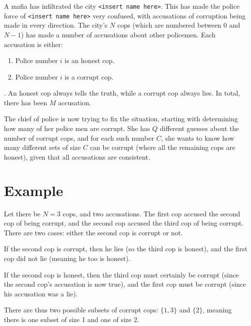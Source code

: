 \newcommand\version{v1}
A mafia has infiltrated the city \texttt{<insert name here>}.
This has made the police force of \texttt{<insert name here>} very confused, with accusations of corruption being made in every direction.
The city's $N$ cops (which are numbered between $0$ and $N - 1$) has made a number of accusations about other policemen.
Each accusation is either:
\begin{enumerate}
  \item Police number $i$ is an honest cop.
  \item Police number $i$ is a corrupt cop.
\end{enumerate}.
An honest cop always tells the truth, while a corrupt cop always lies.
In total, there has been $M$ accusation.

The chief of police is now trying to fix the situation, starting with determining how many
of her police men are corrupt. She has $Q$ different guesses about the number of corrupt cops,
and for each such number $C$, she wants to know how many different sets of size $C$ can be corrupt (where all the remaining cops are honest),
given that all accusations are consistent.

\section*{Example}
Let there be $N = 3$ cops, and two accusations.
The first cop accused the second cop of being corrupt, and the second cop accused the third cop of being corrupt.
There are two cases: either the second cop is corrupt or not.

If the second cop is corrupt, then he lies (so the third cop is honest), and the first cop did not lie (meaning he too is honest).

If the second cop is honest, then the third cop must certainly be corrupt (since the second cop's accusation is now true),
and the first cop must be corrupt (since his accusation was a lie).

There are thus two possible subsets of corrupt cops: $\{1, 3\}$ and $\{2\}$, meaning there is one subset of size 1 and one of size 2.

